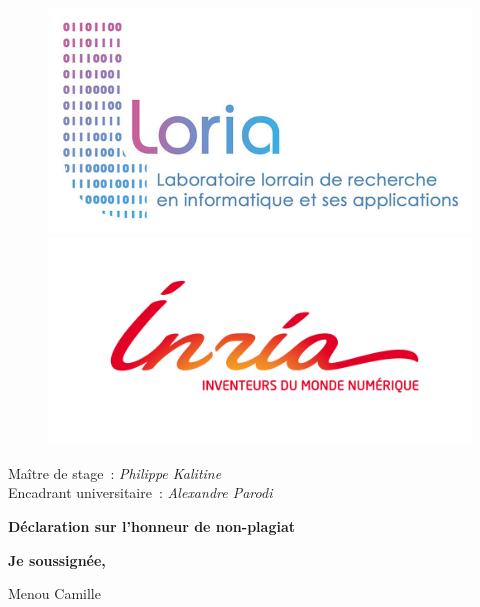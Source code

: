 \documentclass[12pt]{article}
\begin{document}
\begin{center}
\begin{figure}[h]
  \begin{minipage}[c]{.46\linewidth}
    \centering
    \includegraphics[scale=0.3]{gallery/loria.jpg}
  \end{minipage}
  \hfill
  \begin{minipage}[c]{.46\linewidth}
    \centering
    \includegraphics[scale=0.20]{gallery/inria.png}
  \end{minipage}
\end{figure}
\end{center}

\vspace{3cm}
{\raggedright
Maître de stage~: \textit{Philippe Kalitine}
\\
Encadrant universitaire~: \textit{Alexandre Parodi}\pagebreak{}
}

\begin{center}
\textbf{{\huge Déclaration sur l'honneur de non-plagiat}}
\thispagestyle{empty}
\end{center}

\textbf{Je soussignée,}

Menou Camille
\end{document}
